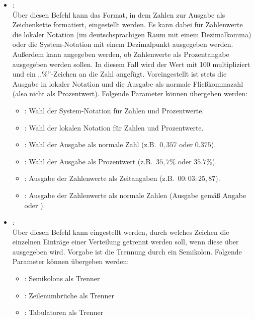 \begin{itemize}

\item
{}:\\
Über diesen Befehl kann das Format, in dem  Zahlen zur Ausgabe als Zeichenkette
formatiert, eingestellt werden. Es kann dabei für Zahlenwerte die lokaler Notation (im deutschsprachigen
Raum mit einem Dezimalkomma) oder die System-Notation mit einem Dezimalpunkt ausgegeben werden. Außerdem
kann angegeben werden, ob Zahlenwerte als Prozentangabe ausgegeben werden sollen. In diesem Fall wird
der Wert mit 100 multipliziert und ein ,,\%''-Zeichen an die Zahl angefügt. Voreingestellt ist stets die
Ausgabe in lokaler Notation und die Ausgabe als normale Fließkommazahl (also nicht als Prozentwert).
Folgende Parameter können  übergeben werden:
\begin{itemize}
\item
{}:
Wahl der System-Notation für Zahlen und Prozentwerte.
\item
{}:
Wahl der lokalen Notation für Zahlen und Prozentwerte.
\item
{}:
Wahl der Ausgabe als normale Zahl (z.B.\ $0{,}357$ oder $0.375$).
\item
{}:
Wahl der Ausgabe als Prozentwert (z.B.\ $35{,}7\%$ oder $35.7\%$).
\item
{}:
Ausgabe der Zahlenwerte als Zeitangaben (z.B.\ $00{:}03{:}25{,}87$).
\item
{}:
Ausgabe der Zahlenwerte als normale Zahlen (Ausgabe gemäß Angabe  oder ).
\end{itemize}

\item
{}:\\
Über diesen Befehl kann eingestellt werden, durch welches Zeichen die einzelnen Einträge
einer Verteilung getrennt werden soll, wenn diese über  ausgegeben wird.
Vorgabe ist die Trennung durch ein Semikolon.
Folgende Parameter können  übergeben werden:
\begin{itemize}
\item
{}:
Semikolons als Trenner
\item
{}:
Zeilenumbrüche als Trenner
\item
{}:
Tabulatoren als Trenner
\end{itemize}

\end{itemize}

